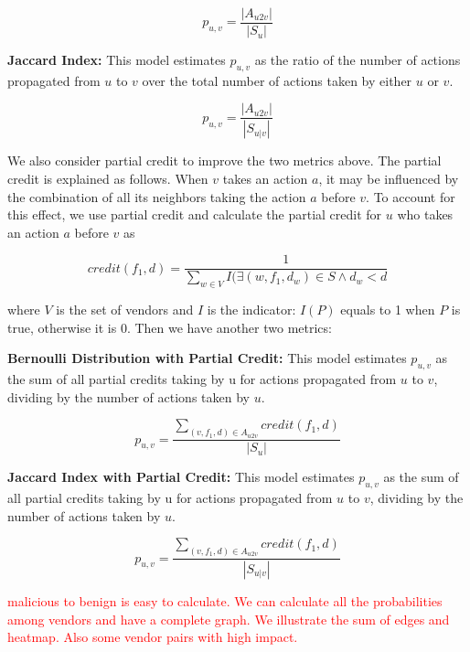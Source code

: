 \begin{equation}
p_{u,v} = \frac{|A_{u2v}|}{|S_u|}
\end{equation}

\textbf{Jaccard Index:} This model estimates $p_{u,v}$ as the ratio of the number of actions propagated from $u$ to $v$ over the total number of actions taken by either $u$ or $v$.

\begin{equation}
p_{u,v} = \frac{|A_{u2v}|}{|S_{u|v}|}
\end{equation}

We also consider partial credit to improve the two metrics above.
The partial credit is explained as follows. When $v$ takes an action $a$, it may be influenced by the combination of all its neighbors taking the action $a$ before $v$. To account for this effect, we use partial credit and calculate the partial credit for $u$ who takes an action $a$ before $v$ as

\begin{equation}
credit(f_1, d) = \frac{1}{\sum_{w \in V}I(\exists (w, f_1, d_w) \in S \land d_w<d}
\end{equation}

where $V$ is the set of vendors and $I$ is the indicator: $I(P)$ equals to 1 when $P$ is true, otherwise it is 0. Then we have another two metrics:

\textbf{Bernoulli Distribution with Partial Credit:} This model estimates $p_{u,v}$ as the sum of all partial credits taking by u for actions propagated from $u$ to $v$, dividing by the number of actions taken by $u$.

\begin{equation}
p_{u,v} = \frac{\sum_{(v,f_1,d)\in A_{u2v}}credit(f_1, d)}{|S_{u}|}
\end{equation}

\textbf{Jaccard Index with Partial Credit:} This model estimates $p_{u,v}$ as the sum of all partial credits taking by u for actions propagated from $u$ to $v$, dividing by the number of actions taken by $u$.

\begin{equation}
p_{u,v} = \frac{\sum_{(v,f_1,d)\in A_{u2v}}credit(f_1, d)}{|S_{u|v}|}
\end{equation}

\textcolor{red}{malicious to benign is easy to calculate. We can calculate all the probabilities among vendors and have a complete graph. We illustrate the sum of edges and heatmap. Also some vendor pairs with high impact.}
